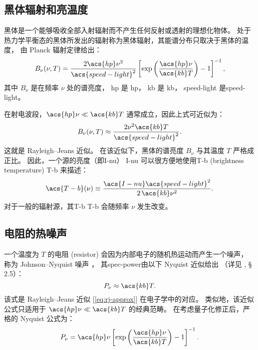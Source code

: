 \subsection{黑体辐射和亮温度}
\label{sec:blackbody}

黑体是一个能够吸收全部入射辐射而不产生任何反射或透射的理想化物体。
处于热力学平衡态的黑体所发出的辐射称为黑体辐射，其能谱分布只取决于黑体的温度，
由 Planck 辐射定律给出：
\begin{equation}
  \label{eq:planck}
  B_{\nu}(\nu, T) = \frac{2 \acs{hp} \nu^3}{\acs{speed-light}^2}
    \left[ \exp\left( \frac{\acs{hp} \nu}{\acs{kb} T} \right) - 1 \right]^{-1} ,
\end{equation}
其中 $B_{\nu}$ 是在频率 $\nu$ 处的谱亮度，
\acs{hp} 是 \acl{hp}，
\acs{kb} 是 \acl{kb}，
\acs{speed-light} 是\acl{speed-light}。

在射电波段，$\acs{hp}\nu \ll \acs{kb}T$ 通常成立，因此上式可近似为：
\begin{equation}
  \label{eq:rj-approx}
  B_{\nu}(\nu, T)
    \approx \frac{2 \nu^2 \acs{kb} T}{\acs{speed-light}^2} .
\end{equation}
这就是 Rayleigh--Jeans 近似。
在该近似下，黑体的谱亮度 $B_{\nu}$ 与其温度 $T$ 严格成正比。
因此，一个源的亮度（即\acl{I-nu}） \ac{I-nu}
可以很方便地使用\acl{T-b} (brightness temperature) \ac{T-b} 来描述：
\begin{equation}
  \label{eq:Tb}
  \acs{T-b}(\nu)
    \equiv \frac{\acs{I-nu} \acs{speed-light}^2}{2 \,\acs{kb} \nu^2} .
\end{equation}
对于一般的辐射源，其\acl{T-b} \ac{T-b} 会随频率 $\nu$ 发生改变。

\subsection{电阻的热噪声}

一个温度为 $T$ 的电阻 (resistor) 会因为内部电子的随机热运动而产生一个噪声，
称为 Johnson--Nyquist 噪声 \cite{johnson1928,nyquist1928}，
其\ac{spec-power}由以下 Nyquist 近似给出
（详见 , \S\,2.5）：
\begin{equation}
  \label{eq:nyquist-approx}
  P_{\nu} \approx \acs{kb} T .
\end{equation}
该式是 Rayleigh--Jeans 近似 [\autoref{eq:rj-approx}] 在电子学中的对应。
类似地，该近似公式只适用于 $\acs{hp}\nu \ll \acs{kb}T$ 的经典范畴。
在考虑量子化修正后，严格的 Nyquist 公式为：
\begin{equation}
  \label{eq:nyquist}
  P_{\nu} = \acs{hp} \nu
    \left[ \exp\left( \frac{\acs{hp} \nu}{\acs{kb} T} \right) - 1 \right]^{-1} .
\end{equation}


